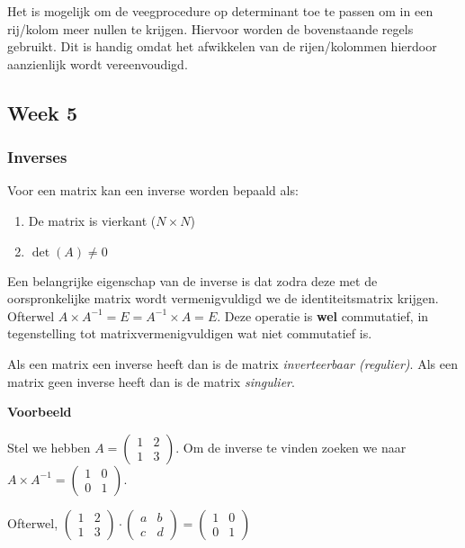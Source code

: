 \documentclass[11pt]{article}
\providecommand{\tightlist}{%
      \setlength{\itemsep}{0pt}\setlength{\parskip}{0pt}}
\begin{document}
Het is mogelijk om de veegprocedure op determinant toe te passen om in
een rij/kolom meer nullen te krijgen. Hiervoor worden de bovenstaande
regels gebruikt. Dit is handig omdat het afwikkelen van de
rijen/kolommen hierdoor aanzienlijk wordt vereenvoudigd.

    \hypertarget{week-5}{%
\subsection{Week 5}\label{week-5}}

    \hypertarget{inverses}{%
\subsubsection{Inverses}\label{inverses}}

    Voor een matrix kan een inverse worden bepaald als:

\begin{enumerate}
\def\labelenumi{\arabic{enumi}.}
\tightlist
\item
  De matrix is vierkant (\(N \times N\))
\item
  \(\det(A) \not=0\)
\end{enumerate}

Een belangrijke eigenschap van de inverse is dat zodra deze met de
oorspronkelijke matrix wordt vermenigvuldigd we de identiteitsmatrix
krijgen. Ofterwel \(A \times A^{-1} = E = A^{-1} \times A = E\). Deze
operatie is \textbf{wel} commutatief, in tegenstelling tot
matrixvermenigvuldigen wat niet commutatief is.

Als een matrix een inverse heeft dan is de matrix \emph{inverteerbaar
(regulier)}. Als een matrix geen inverse heeft dan is de matrix
\emph{singulier}.

\textbf{Voorbeeld}

Stel we hebben \(A=\begin{pmatrix}1&2\\1&3\end{pmatrix}\). Om de inverse
te vinden zoeken we naar
\(A \times A^{-1} = \begin{pmatrix}1&0\\0&1\end{pmatrix}\).

Ofterwel,
\(\begin{pmatrix}1&2\\1&3\end{pmatrix} \cdot \begin{pmatrix}a&b\\c&d\end{pmatrix} = \begin{pmatrix}1&0\\0&1\end{pmatrix}\)
\end{document}
